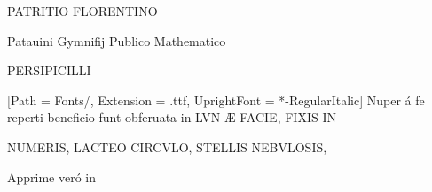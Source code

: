 \documentclass{article}
\begin{document}
\begin{center}
\vspace{2mm}
{\fontsize{25}{25}\selectfont
P\hspace{2mm}A\hspace{2mm}T\hspace{2mm}R\hspace{2mm}I\hspace{2mm}T\hspace{2mm}I\hspace{2mm}O\hspace{2mm} F\hspace{2mm}L\hspace{2mm}O\hspace{2mm}R\hspace{2mm}E\hspace{2mm}N\hspace{2mm}T\hspace{2mm}I\hspace{2mm}N\hspace{2mm}O}


\vspace{1mm}
\fontsize{20}{20}\selectfont
Patauini Gymnifij Publico Mathematico


\vspace{2mm}
{\fontsize{25}{25}\selectfont
P\hspace{3mm}E\hspace{3mm}R\hspace{3mm}S\hspace{3mm}I\hspace{3mm}P\hspace{3mm}I\hspace{3mm}C\hspace{3mm}I\hspace{3mm}L\hspace{3mm}L\hspace{3mm}I}


\setmainfont{EBGaramond}[Path = Fonts/, 
                         Extension = .ttf,
                         UprightFont = *-RegularItalic]
\vspace{2mm}
\fontsize{14}{14}\selectfont
Nuper á fe reperti beneficio funt obferuata in LVN Æ FACIE, FIXIS IN-

\vspace{1mm}
NUMERIS, LACTEO CIRCVLO, STELLIS NEBVLOSIS,

\vspace{1mm}
Apprime veró in



\end{center}
\end{document}
